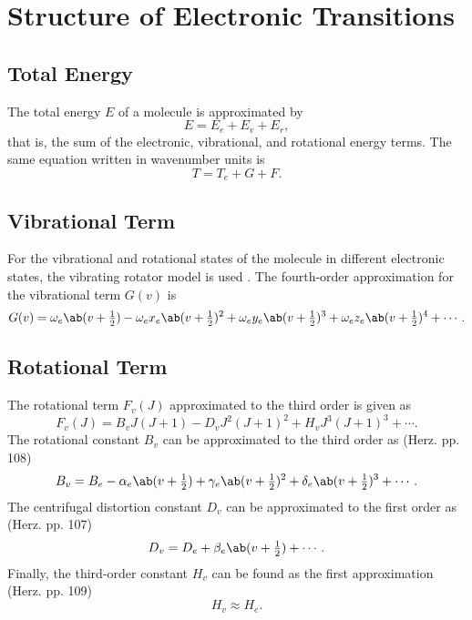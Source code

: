 \chapter{Structure of Electronic Transitions}
\label{c:structure_of_electronic_transitions}

\section{Total Energy}
\label{s:total_energy}

The total energy $E$ of a molecule is approximated by
\begin{equation*}
    E = E_{e} + E_{v} + E_{r},
\end{equation*}
that is, the sum of the electronic, vibrational, and rotational energy terms. The same equation written in wavenumber units is
\begin{equation}
    T = T_{e} + G + F.
\end{equation}

\section{Vibrational Term}
\label{s:vibrational_term}

For the vibrational and rotational states of the molecule in different electronic states, the vibrating rotator model is used \cite{herzberg:diatomic}. The fourth-order approximation for the vibrational term $G(v)$ is
\begin{equation}
    G(v) = \omega_{e}\ab(v + \tfrac{1}{2}) - \omega_{e}x_{e}\ab(v + \tfrac{1}{2})^{2} + \omega_{e}y_{e}\ab(v + \tfrac{1}{2})^{3} + \omega_{e}z_{e}\ab(v + \tfrac{1}{2})^{4} + \dotsb.
\end{equation}

\section{Rotational Term}
\label{s:rotational_term}

The rotational term $F_{v}(J)$ approximated to the third order is given as
\begin{equation}
    F_{v}(J) = B_{v}J(J + 1) - D_{v}J^{2}(J + 1)^{2} + H_{v}J^{3}(J + 1)^{3} + \dotsb.
\end{equation}
The rotational constant $B_{v}$ can be approximated to the third order as (Herz. pp. 108)
\begin{equation*}
    B_{v} = B_{e} - \alpha_{e}\ab(v + \tfrac{1}{2}) + \gamma_{e}\ab(v + \tfrac{1}{2})^{2} + \delta_{e}\ab(v + \tfrac{1}{2})^{3} + \dotsb.
\end{equation*}
The centrifugal distortion constant $D_{v}$ can be approximated to the first order as (Herz. pp. 107)
\begin{equation}
    D_{v} = D_{e} + \beta_{e}\ab(v + \tfrac{1}{2}) + \dotsb.
\end{equation}
Finally, the third-order constant $H_{v}$ can be found as the first approximation (Herz. pp. 109)
\begin{equation}
    H_{v} \approx H_{e}.
\end{equation}

